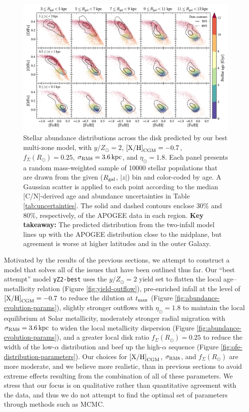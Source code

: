 \documentclass[twocolumn,twocolappendix,linenumbers]{aastex631}
\newcommand{\mathXH}{{\rm [X/H]}}
\newcommand{\yZ}[1]{$y/Z_\odot=#1$}
\newcommand{\kpc}{\,{\rm kpc}}
\begin{document}
\begin{figure}
    \centering
    \includegraphics[width=\linewidth]{figures/ofe_feh_best.pdf}
    \caption{Stellar abundance distributions across the disk predicted by our best multi-zone model, with \yZ{2}, ${\rm [X/H]}_{\rm CGM}=-0.7$, $f_\Sigma(R_\odot)=0.25$, $\sigma_{\rm RM8}=3.6\kpc$, and $\eta_\odot=1.8$. Each panel presents a random mass-weighted sample of \num{10000} stellar populations that are drawn from the given ($R_{\rm gal}$, $|z|$) bin and color-coded by age. A Gaussian scatter is applied to each point according to the median [C/N]-derived age and abundance uncertainties in Table \ref{tab:uncertainties}. The solid and dashed contours enclose 30\% and 80\%, respectively, of the APOGEE data in each region. {\bf Key takeaway:} The predicted distribution from the two-infall model lines up with the APOGEE distribution close to the midplane, but agreement is worse at higher latitudes and in the outer Galaxy.}
    \label{fig:ofe-feh-best}
\end{figure}

Motivated by the results of the previous sections, we attempt to construct a model that solves all of the issues that have been outlined thus far. Our ``best attempt'' model {\tt yZ2-best} uses the \yZ{2} yield set to flatten the local age--metallicity relation (Figure \ref{fig:yield-outflow}), pre-enriched infall at the level of $\mathXH_{\rm CGM}=-0.7$ to reduce the dilution at $t_{\rm max}$ (Figure \ref{fig:abundance-evolution-params}), slightly stronger outflows with $\eta_\odot=1.8$ to maintain the local equilibrium at Solar metallicity, moderately stronger radial migration with $\sigma_{\rm RM8}=3.6\kpc$ to widen the local metallicity dispersion (Figure \ref{fig:abundance-evolution-params}), and a greater local disk ratio $f_\Sigma(R_\odot)=0.25$ to reduce the width of the low-$\alpha$ distribution and beef up the high-$\alpha$ sequence (Figure \ref{fig:ofe-distribution-parameters}). Our choices for $\mathXH_{\rm CGM}$, $\sigma_{\rm RM8}$, and $f_\Sigma(R_\odot)$ are more moderate, and we believe more realistic, than in previous sections to avoid extreme effects resulting from the combination of all of these parameters. We stress that our focus is on qualitative rather than quantitative agreement with the data, and thus we do not attempt to find the optimal set of parameters through methods such as MCMC.
\end{document}
